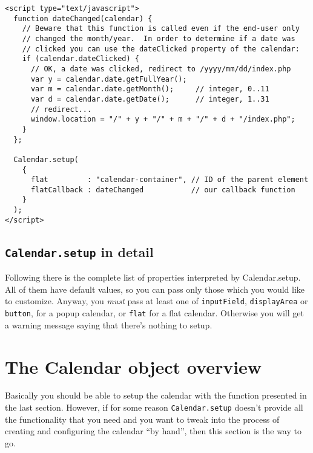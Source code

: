 \documentclass[a4paper,10pt]{article}
\begin{document}
\begin{verbatim}
<script type="text/javascript">
  function dateChanged(calendar) {
    // Beware that this function is called even if the end-user only
    // changed the month/year.  In order to determine if a date was
    // clicked you can use the dateClicked property of the calendar:
    if (calendar.dateClicked) {
      // OK, a date was clicked, redirect to /yyyy/mm/dd/index.php
      var y = calendar.date.getFullYear();
      var m = calendar.date.getMonth();     // integer, 0..11
      var d = calendar.date.getDate();      // integer, 1..31
      // redirect...
      window.location = "/" + y + "/" + m + "/" + d + "/index.php";
    }
  };

  Calendar.setup(
    {
      flat         : "calendar-container", // ID of the parent element
      flatCallback : dateChanged           // our callback function
    }
  );
</script>
\end{verbatim}

\subsection{\texttt{Calendar.setup} in detail}\label{sec:Calendar.setup}

Following there is the complete list of properties interpreted by
Calendar.setup.  All of them have default values, so you can pass only those
which you would like to customize.  Anyway, you \emph{must} pass at least one
of \texttt{inputField}, \texttt{displayArea} or \texttt{button}, for a popup
calendar, or \texttt{flat} for a flat calendar.  Otherwise you will get a
warning message saying that there's nothing to setup.

\begin{small}
\ifx\shipout\undefined

\else
{}
\fi
\end{small}




\section{The Calendar object overview}\label{sec:Calendar_overview}

Basically you should be able to setup the calendar with the function presented
in the last section.  However, if for some reason \texttt{Calendar.setup}
doesn't provide all the functionality that you need and you want to tweak into
the process of creating and configuring the calendar ``by hand'', then this
section is the way to go.
\end{document}
